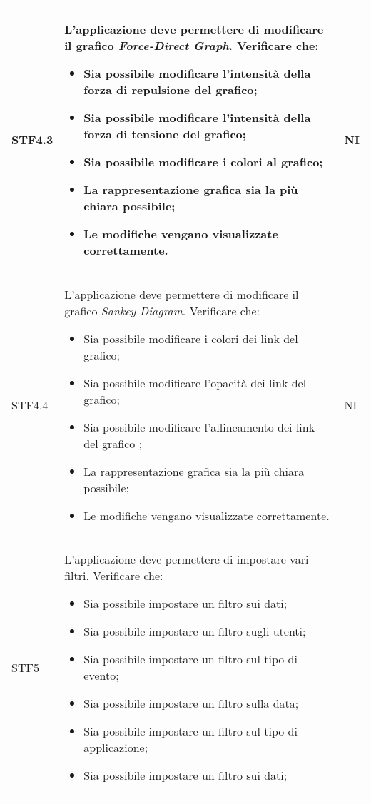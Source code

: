 \begin{center}
\begin{longtable}{|p{1.5cm}|p{11cm}|p{1cm}|}
        \rowcolor[HTML]{C0C0C0}
        STF4.3 & L'applicazione deve permettere di modificare il grafico \textit{Force-Direct Graph}. Verificare che: \begin{itemize}
            \item Sia possibile modificare l'intensità della forza di repulsione del grafico;
            \item Sia possibile modificare l'intensità della forza di tensione del grafico;
            \item Sia possibile modificare i colori al grafico;
            \item La rappresentazione grafica sia la più chiara possibile;
            \item Le modifiche vengano visualizzate correttamente.
        \end{itemize} & NI\\ \hline
        \rowcolor[HTML]{EFEFEF}
        STF4.4 & L'applicazione deve permettere di modificare il grafico \textit{Sankey Diagram}. Verificare che: \begin{itemize}
            \item Sia possibile modificare i colori dei link del grafico;
            \item Sia possibile modificare l'opacità dei link del grafico;
            \item Sia possibile modificare l'allineamento dei link del grafico ;
            \item La rappresentazione grafica sia la più chiara possibile;    
            \item Le modifiche vengano visualizzate correttamente.
        \end{itemize} & NI\\ \hline
        \rowcolor[HTML]{C0C0C0}
        STF5 & L'applicazione deve permettere di impostare vari filtri. Verificare che: \begin{itemize}
            \item Sia possibile impostare un filtro sui dati;
            \item Sia possibile impostare un filtro sugli utenti;
            \item Sia possibile impostare un filtro sul tipo di evento;
            \item Sia possibile impostare un filtro sulla data;
            \item Sia possibile impostare un filtro sul tipo di applicazione;
            \item Sia possibile impostare un filtro sui dati;

\end{itemize}
\end{longtable}
\end{center}
